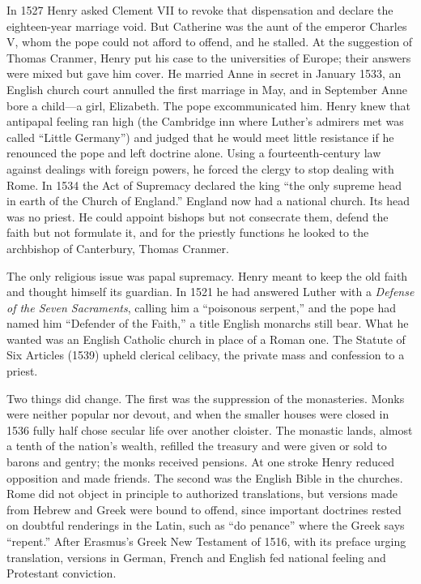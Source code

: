 In 1527 Henry asked Clement VII to revoke that dispensation and declare the eighteen-year marriage
void. But Catherine was the aunt of the emperor Charles V, whom the pope could not afford to offend,
and he stalled. At the suggestion of Thomas Cranmer, Henry put his case to the universities of Europe;
their answers were mixed but gave him cover. He married Anne in secret in January 1533, an English church court annulled the first marriage in May, and in September Anne bore a child---a girl,
Elizabeth. The pope excommunicated him. Henry knew that antipapal feeling ran high (the Cambridge inn
where Luther's admirers met was called ``Little Germany'') and judged that he would meet little
resistance if he renounced the pope and left doctrine alone. Using a fourteenth-century law against
dealings with foreign powers, he forced the clergy to stop dealing with Rome. In 1534 the Act of
Supremacy declared the king ``the only supreme head in earth of the Church of England.'' England now
had a national church. Its head was no priest. He could appoint bishops but not consecrate them,
defend the faith but not formulate it, and for the priestly functions he looked to the archbishop of
Canterbury, Thomas Cranmer.

The only religious issue was papal supremacy. Henry meant to keep the old faith and thought himself
its guardian. In 1521 he had answered Luther with a \emph{Defense of the Seven Sacraments}, calling
him a ``poisonous serpent,'' and the pope had named him ``Defender of the Faith,'' a title English
monarchs still bear. What he wanted was an English Catholic church in place of a Roman one. The
Statute of Six Articles (1539) upheld clerical celibacy, the private mass and confession to a priest.

Two things did change. The first was the suppression of the monasteries. Monks were neither popular
nor devout, and when the smaller houses were closed in 1536 fully half chose secular life over another
cloister. The monastic lands, almost a tenth of the nation's wealth, refilled the treasury and were
given or sold to barons and gentry; the monks received pensions. At one stroke Henry reduced
opposition and made friends. The second was the English Bible in the churches. Rome did not object in
principle to authorized translations, but versions made from Hebrew and Greek were bound to offend,
since important doctrines rested on doubtful renderings in the Latin, such as ``do penance'' where the
Greek says ``repent.'' After Erasmus's Greek New Testament of 1516, with its preface urging
translation, versions in German, French and English fed national feeling and Protestant conviction.


